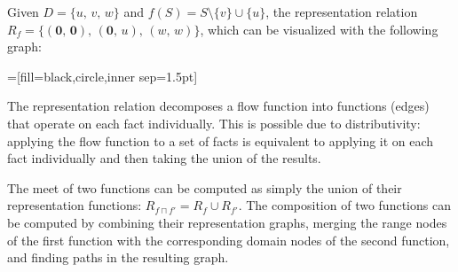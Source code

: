 \begin{example}\label{ex:flowfun}
    Given $D=\{u,\,v,\,w\}$ and $f(S) = S\setminus\{v\} \cup \{u\}$,
    the representation relation 
  $
    R_f=\{(\mathbf0,\,\mathbf0),\,(\mathbf0,\,u),\,(w,\,w)\}
$, which can be visualized with the following graph:
   \begin{center}
    =[fill=black,circle,inner sep=1.5pt]
  \end{center}
\end{example}

The representation relation decomposes a flow function into functions
(edges) that operate on each fact individually. This is possible due
to distributivity: applying the flow function to a set of facts is
equivalent to applying it on each fact individually and then
taking the union of the results.

The meet of two functions can be computed as simply the union of their representation
functions: $R_{f\sqcap f'} = R_f \cup R_{f'}$. The composition of two functions can be
computed by combining their representation graphs, merging the range nodes of the
first function with the corresponding domain nodes of the second function, and finding
paths in the resulting graph.


